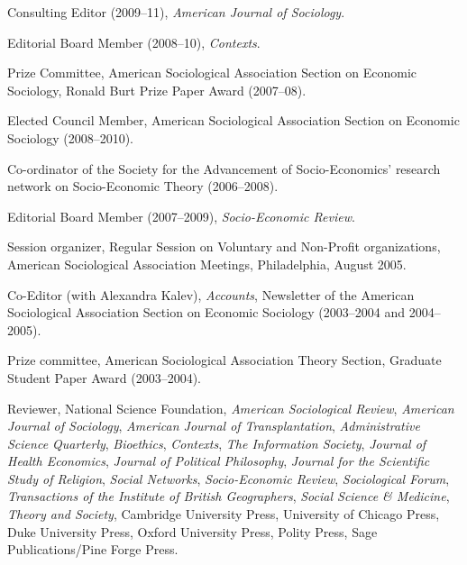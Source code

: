 \documentclass[11pt]{article}
\begin{document}
\bigskip 

\newpage

\medskip

\medskip

\ind Consulting Editor (2009--11), \emph{American Journal of Sociology}.

\ind Editorial Board Member (2008--10), \emph{Contexts}. 

\ind Prize Committee, American Sociological Association Section on Economic Sociology, Ronald Burt Prize Paper Award (2007--08).

\ind Elected Council Member, American Sociological Association Section on Economic
Sociology (2008--2010). 

\ind Co-ordinator of the Society for the Advancement of Socio-Economics' research network on Socio-Economic Theory (2006--2008). 

\ind Editorial Board Member (2007--2009), \emph{Socio-Economic Review}.

\ind Session organizer, Regular Session on Voluntary and Non-Profit organizations, American Sociological Association Meetings, Philadelphia, August 2005.

\ind Co-Editor (with Alexandra Kalev), \emph{Accounts}, Newsletter of the American Sociological Association Section on Economic Sociology (2003--2004 and 2004--2005).

\ind Prize committee, American Sociological Association Theory Section, Graduate Student Paper Award (2003--2004).

\ind Reviewer, National Science Foundation, \emph{American
  Sociological Review}, \emph{American Journal of Sociology},
\emph{American Journal of Transplantation}, \emph{Administrative
  Science Quarterly}, \emph{Bioethics}, \emph{Contexts}, \emph{The Information
  Society}, \emph{Journal of Health Economics}, \emph{Journal of Political Philosophy}, \emph{Journal for the Scientific Study of Religion}, \emph{Social Networks}, \emph{Socio-Economic Review}, \emph{Sociological Forum}, \emph{Transactions of the Institute of British Geographers}, \emph{Social Science \& Medicine}, \emph{Theory and Society}, Cambridge University Press, University of Chicago Press, Duke University Press, Oxford University Press, Polity Press, Sage Publications/Pine Forge Press.
\end{document}
